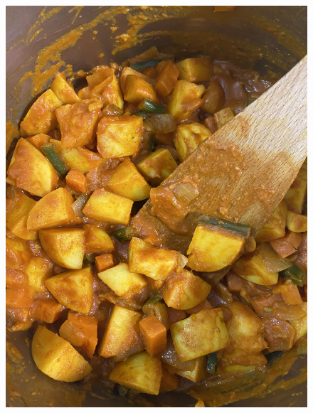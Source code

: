 \documentclass[]{article}
\begin{document}
\newpage\begin{figure}[H]
\begin{center}\hyperref[rec:Potato Curry]{\includegraphics[keepaspectratio,width=\textheight,height=\textwidth,angle=-90]{Gallery/Potato Curry}}\caption*{}\label{fig:Potato Curry}\end{center}
\end{figure}
\end{document}
